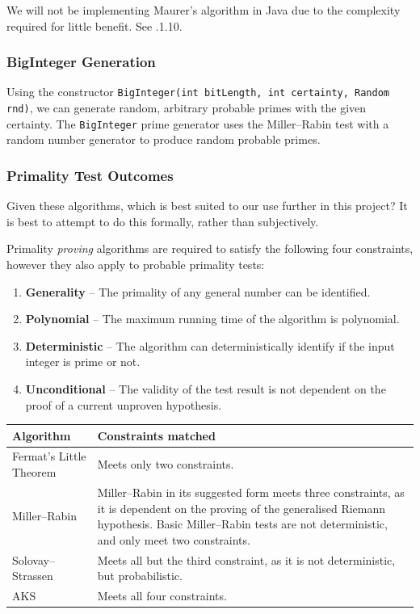       We will not be implementing Maurer's algorithm in Java due to the complexity required for little benefit. See .1.10.
    
    \subsubsection{BigInteger Generation}
    
    Using the constructor \verb!BigInteger(int bitLength, int certainty, Random rnd)!, we can generate random, arbitrary probable primes with the given certainty. The \verb!BigInteger! prime generator uses the Miller--Rabin test\cite{Java:2006ab} with a random number generator to produce random probable primes.
    
    \subsubsection{Primality Test Outcomes}
    
    Given these algorithms, which is best suited to our use further in this project? It is best to attempt to do this formally, rather than subjectively.
    
    Primality \emph{proving} algorithms are required to satisfy the following four constraints, however they also apply to probable primality tests:
    
    \begin{enumerate}
      \item \textbf{Generality} -- The primality of any general number can be identified.
      \item \textbf{Polynomial} -- The maximum running time of the algorithm is polynomial.
      \item \textbf{Deterministic} -- The algorithm can deterministically identify if the input integer is prime or not.
      \item \textbf{Unconditional} -- The validity of the test result is not dependent on the proof of a current unproven hypothesis.
    \end{enumerate}
    
    \begin{center}
        \begin{tabular}{ | l | p{7cm} |}
          \hline
          \textbf{Algorithm} & \textbf{Constraints matched}  \\ \hline
          Fermat's Little Theorem & Meets only two constraints. \\ \hline
          Miller--Rabin & Miller--Rabin in its suggested form meets three constraints, as it is dependent on the proving of the generalised Riemann hypothesis. Basic Miller--Rabin tests are not deterministic, and only meet two constraints. \\ \hline
          Solovay--Strassen &  Meets all but the third constraint, as it is not deterministic, but probabilistic.\\ \hline
          AKS & Meets all four constraints. \\ \hline
        \end{tabular}
      \end{center}
    
